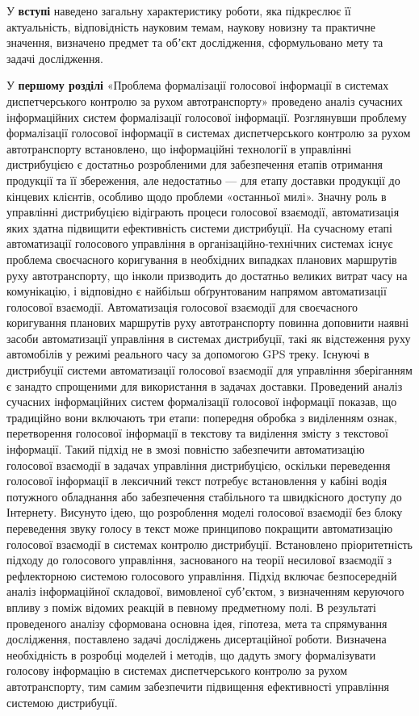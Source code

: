 У \textbf{вступі} наведено загальну характеристику роботи, яка підкреслює її
актуальність, відповідність науковим темам, наукову новизну та практичне
значення, визначено предмет та обʼєкт дослідження, сформульовано мету та задачі
дослідження.

У \textbf{першому розділі} «Проблема формалізації голосової інформації в системах диспетчерського контролю за рухом автотранспорту» проведено аналіз сучасних інформаційних систем формалізації голосової інформації. 
Розглянувши проблему формалізації голосової інформації в системах диспетчерського контролю за рухом автотранспорту встановлено, що інформаційні технології в управлінні дистрибуцією є достатньо розробленими для забезпечення етапів отримання продукції та її збереження, але недостатньо --- для етапу доставки продукції до кінцевих клієнтів, особливо щодо проблеми «останньої милі». Значну роль в управлінні дистрибуцією відіграють процеси голосової взаємодії, автоматизація яких здатна підвищити ефективність системи дистрибуції.
На сучасному етапі автоматизації голосового управління в організаційно-технічних системах існує проблема своєчасного коригування в необхідних випадках планових маршрутів руху автотранспорту, що інколи призводить до достатньо великих витрат часу на комунікацію, і відповідно є найбільш обґрунтованим напрямом автоматизації голосової взаємодії.
Автоматизація голосової взаємодії для своєчасного коригування планових маршрутів руху автотранспорту повинна доповнити наявні засоби автоматизації управління в системах дистрибуції, такі як відстеження руху автомобілів у режимі реального часу за допомогою GPS треку. Існуючі в дистрибуції системи автоматизації голосової взаємодії для управління зберіганням є занадто спрощеними для використання в задачах доставки.
Проведений аналіз сучасних інформаційних систем формалізації голосової інформації показав, що традиційно вони включають три етапи: попередня обробка з виділенням ознак, перетворення голосової інформації в текстову та виділення змісту з текстової інформації. Такий підхід не в змозі повністю забезпечити автоматизацію голосової взаємодії в задачах управління дистрибуцією, оскільки переведення голосової інформації в лексичний текст потребує встановлення у кабіні водія потужного обладнання або забезпечення стабільного та швидкісного доступу до Інтернету. Висунуто ідею, що розроблення моделі голосової взаємодії без блоку переведення звуку голосу в текст може принципово покращити автоматизацію голосової взаємодії в системах контролю дистрибуції.
Встановлено пріоритетність підходу до голосового управління, заснованого на теорії несилової взаємодії з рефлекторною системою голосового управління. Підхід включає безпосередній аналіз інформаційної складової, вимовленої субʼєктом, з визначенням керуючого впливу з поміж відомих реакцій в певному предметному полі.
В результаті проведеного аналізу сформована основна ідея, гіпотеза, мета та спрямування дослідження, поставлено задачі досліджень дисертаційної роботи. Визначена необхідність в розробці моделей і методів, що дадуть змогу формалізувати голосову інформацію в системах диспетчерського контролю за рухом автотранспорту, тим самим забезпечити підвищення ефективності управління системою дистрибуції.

